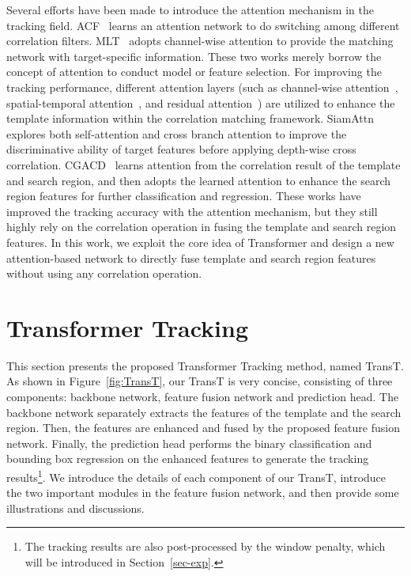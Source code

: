 \documentclass[final]{cvpr}
\begin{document}
Several efforts have been made to introduce the attention mechanism in the tracking field. 
ACF~\cite{ACF} learns an attention network to do switching among different correlation filters. 
MLT~\cite{MLT} adopts channel-wise attention to provide the matching network with target-specific information. 
These two works merely borrow the concept of attention to conduct model or feature selection. 
For improving the tracking performance, different attention layers (such as channel-wise attention~\cite{RASNet,SA-Siam}, 
spatial-temporal attention~\cite{CFSTA}, and residual attention~\cite{RASNet}) are utilized to enhance the template 
information within the correlation matching framework.
SiamAttn~\cite{DSA} explores both self-attention and cross branch attention to improve the discriminative ability of 
target features before applying depth-wise cross correlation. 
CGACD~\cite{CGACD} learns attention from the correlation result of the template and search region, and then 
adopts the learned attention to enhance the search region features for further classification and regression. 
These works have improved the tracking accuracy with the attention mechanism, but they still highly rely on the 
correlation operation in fusing the template and search region features. 
In this work, we exploit the core idea of Transformer and design a new attention-based network to directly fuse template 
and search region features without using any correlation operation. 
\section{Transformer Tracking}
\label{sec:TransT}
This section presents the proposed Transformer Tracking method, named TransT. 
As shown in Figure~\ref{fig:TransT}, our TransT is very concise, consisting of three components: 
backbone network, feature fusion network and prediction head. 
The backbone network separately extracts the features of the template and the search region. 
Then, the features are enhanced and fused by the proposed feature fusion network. 
Finally, the prediction head performs the binary classification and bounding box regression on 
the enhanced features to generate the tracking results\footnote{The tracking results are also post-processed 
by the window penalty, which will be introduced in Section~\ref{sec-exp}.}.
We introduce the details of each component of our TransT, introduce the two important modules 
in the feature fusion network, and then provide some illustrations and discussions.
\end{document}
